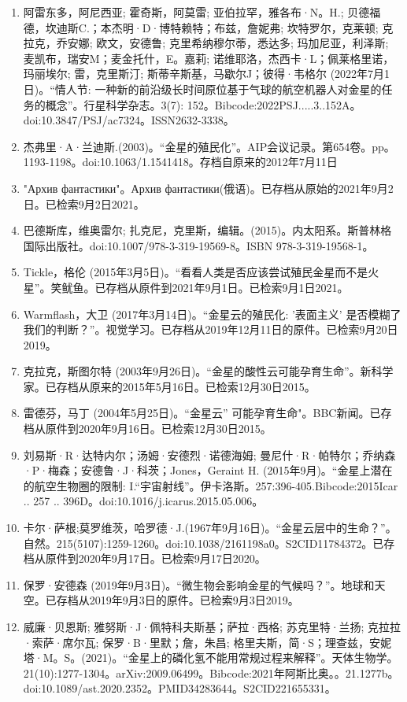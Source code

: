 \begin{enumerate}
\item 阿雷东多，阿尼西亚; 霍奇斯，阿莫雷; 亚伯拉罕，雅各布·N。H.; 贝德福德，坎迪斯C.；本杰明·D·博特赖特；布兹，詹妮弗; 坎特罗尔，克莱顿; 克拉克，乔安娜; 欧文，安德鲁; 克里希纳穆尔蒂，悉达多; 玛加尼亚，利泽斯; 麦凯布，瑞安M；麦金托什，E。嘉莉; 诺维耶洛，杰西卡·L；佩莱格里诺，玛丽埃尔; 雷，克里斯汀; 斯蒂辛斯基，马歇尔J；彼得·韦格尔 (2022年7月1日)。“情人节: 一种新的前沿级长时间原位基于气球的航空机器人对金星的任务的概念”。行星科学杂志。3(7): 152。Bibcode:2022PSJ.....3..152A。doi:10.3847/PSJ/ac7324。ISSN2632-3338。 
\item 杰弗里·A·兰迪斯.(2003)。“金星的殖民化”。AIP会议记录。第654卷。pp。 1193-1198。doi:10.1063/1.1541418。存档自原来的2012年7月11日
\item "Архив фантастики"。Архив фантастики(俄语)。已存档从原始的2021年9月2日。已检索9月2日2021。
\item 巴德斯库，维奥雷尔; 扎克尼，克里斯，编辑。(2015)。内太阳系。斯普林格国际出版社。doi:10.1007/978-3-319-19569-8。ISBN 978-3-319-19568-1。
\item Tickle，格伦 (2015年3月5日)。“看看人类是否应该尝试殖民金星而不是火星”。笑鱿鱼。已存档从原件到2021年9月1日。已检索9月1日2021。
\item Warmflash，大卫 (2017年3月14日)。“金星云的殖民化: '表面主义' 是否模糊了我们的判断？”。视觉学习。已存档从2019年12月11日的原件。已检索9月20日2019。
\item 克拉克，斯图尔特 (2003年9月26日)。“金星的酸性云可能孕育生命”。新科学家。已存档从原来的2015年5月16日。已检索12月30日2015。
\item 雷德芬，马丁 (2004年5月25日)。“金星云” 可能孕育生命"。BBC新闻。已存档从原件到2020年9月16日。已检索12月30日2015。
\item 刘易斯·R·达特内尔；汤姆·安德烈·诺德海姆; 曼尼什·R·帕特尔；乔纳森·P·梅森；安德鲁·J·科茨；Jones，Geraint H. (2015年9月)。“金星上潜在的航空生物圈的限制: I.“宇宙射线”。伊卡洛斯。257:396-405.Bibcode:2015Icar .. 257 .. 396D。doi:10.1016/j.icarus.2015.05.006。
\item 卡尔·萨根;莫罗维茨，哈罗德·J.(1967年9月16日)。“金星云层中的生命？”。自然。215(5107):1259-1260。doi:10.1038/2161198a0。S2CID11784372。已存档从原件到2020年9月17日。已检索9月17日2020。 
\item 保罗·安德森 (2019年9月3日)。“微生物会影响金星的气候吗？”。地球和天空。已存档从2019年9月3日的原件。已检索9月3日2019。
\item 威廉·贝恩斯; 雅努斯·J·佩特科夫斯基；萨拉·西格; 苏克里特·兰扬; 克拉拉·索萨·席尔瓦; 保罗·B·里默；詹，朱昌; 格里夫斯，简·S；理查兹，安妮塔·M。S。(2021)。“金星上的磷化氢不能用常规过程来解释”。天体生物学。21(10):1277-1304。arXiv:2009.06499。Bibcode:2021年阿斯比奥。。21.1277b。doi:10.1089/ast.2020.2352。PMID34283644。S2CID221655331。  

\end{enumerate}
